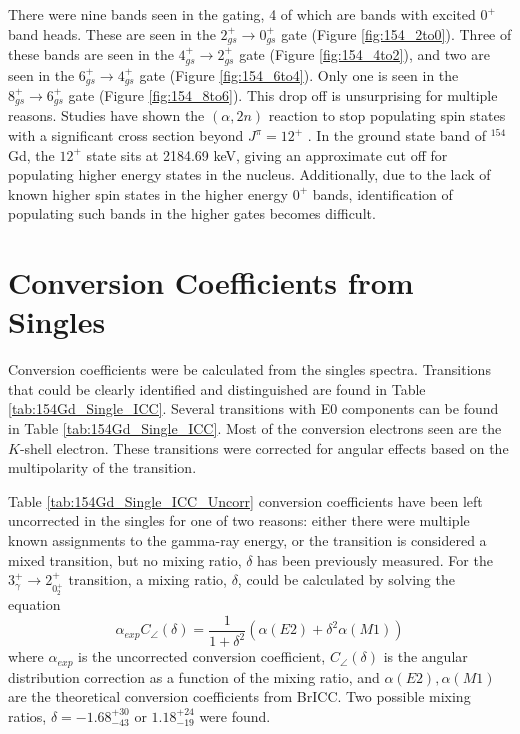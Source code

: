 \afterpage{\clearpage}

There were nine bands seen in the gating, 4 of which are bands with excited $0^+$ band heads. These are seen in the $2^+_{gs}\rightarrow 0^+_{gs}$ gate (Figure \ref{fig:154_2to0}). Three of these bands are seen in the $4^+_{gs}\rightarrow 2^+_{gs}$ gate (Figure \ref{fig:154_4to2}), and two are seen in the $6^+_{gs}\rightarrow 4^+_{gs}$ gate (Figure \ref{fig:154_6to4}). Only one is seen in the $8^+_{gs}\rightarrow 6^+_{gs}$ gate (Figure \ref{fig:154_8to6}). This drop off is unsurprising for multiple reasons. Studies have shown the $(\alpha,2n)$ reaction to stop populating spin states with a significant cross section beyond $J^{\pi}=12^+$ \citep{wu93:_a2n}. In the ground state band of $^{154}$Gd, the $12^+$ state sits at 2184.69 keV, giving an approximate cut off for populating higher energy states in the nucleus. Additionally, due to the lack of known higher spin states in the higher energy $0^+$ bands, identification of populating such bands in the higher gates becomes difficult.

\afterpage{\clearpage}

\afterpage{\clearpage}

\afterpage{\clearpage}

\afterpage{\clearpage}

\section{Conversion Coefficients from Singles}
\label{sec:154_Conv_Singles}

Conversion coefficients were be calculated from the singles spectra. Transitions that could be clearly identified and distinguished are found in Table \ref{tab:154Gd_Single_ICC}. Several transitions with E0 components can be found in Table \ref{tab:154Gd_Single_ICC}. Most of the conversion electrons seen are the $K$-shell electron. These transitions were corrected for angular effects based on the multipolarity of the transition.

Table \ref{tab:154Gd_Single_ICC_Uncorr} conversion coefficients have been left uncorrected in the singles for one of two reasons: either there were multiple known assignments to the gamma-ray energy, or the transition is considered a mixed transition, but no mixing ratio, $\delta$ has been previously measured. For the $3^{+}_{\gamma}\rightarrow 2^+_{0^+_2}$ transition, a mixing ratio, $\delta$, could be calculated by solving the equation
\begin{equation}
    \alpha_{exp}C_{\angle}(\delta)=\frac{1}{1+\delta^2}(\alpha(E2)+\delta^2\alpha(M1))
\end{equation}
where $\alpha_{exp}$ is the uncorrected conversion coefficient, $C_{\angle}(\delta)$ is the angular distribution correction as a function of the mixing ratio, and $\alpha(E2),\alpha(M1)$ are the theoretical conversion coefficients from BrICC\citep{kibedi08:_BRICC}. Two possible mixing ratios, $\delta=-1.68^{+30}_{-43}\text{ or }1.18^{+24}_{-19}$ were found.

